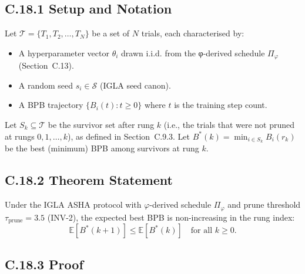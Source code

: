 \subsection*{C.18.1 Setup and Notation}

Let $\mathcal{T} = \{T_1, T_2, \ldots, T_N\}$ be a set of $N$ trials,
each characterised by:
\begin{itemize}
  \item A hyperparameter vector $\theta_i$ drawn i.i.d. from the
        φ-derived schedule $\Pi_\varphi$ (Section~C.13).
  \item A random seed $s_i \in \mathcal{S}$ (IGLA seed canon).
  \item A BPB trajectory $\{B_i(t) : t \geq 0\}$ where $t$ is the
        training step count.
\end{itemize}

Let $S_k \subseteq \mathcal{T}$ be the survivor set after rung $k$
(i.e., the trials that were not pruned at rungs $0, 1, \ldots, k$),
as defined in Section~C.9.3.  Let $B^*(k) = \min_{i \in S_k} B_i(r_k)$
be the best (minimum) BPB among survivors at rung $k$.

\subsection*{C.18.2 Theorem Statement}

\begin{theorem}
\label{thm:benchmark-monotonicity}
Under the IGLA ASHA protocol with $\varphi$-derived schedule $\Pi_\varphi$
and prune threshold $\tau_\mathrm{prune} = 3.5$ (INV-2), the expected
best BPB is non-increasing in the rung index:
\begin{equation}
\mathbb{E}[B^*(k+1)] \leq \mathbb{E}[B^*(k)]
\quad \text{for all } k \geq 0.
\label{eq:monotone}
\end{equation}
\end{theorem}

\subsection*{C.18.3 Proof}

